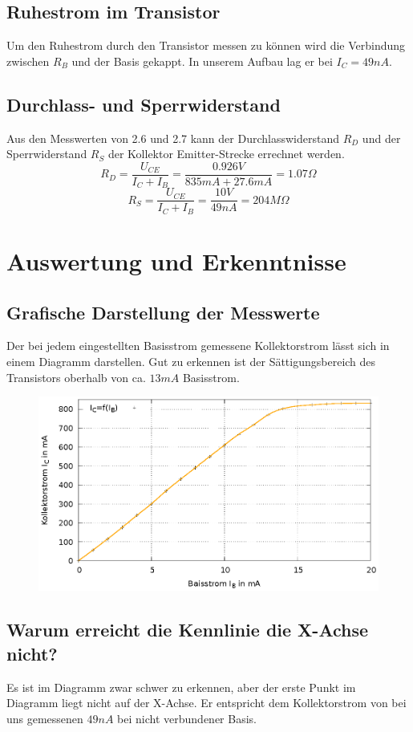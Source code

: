 \documentclass[
a4paper,     %
 headsepline, %
11pt         %
]{scrartcl}  %
\begin{document}
\subsection{Ruhestrom im Transistor}
Um den Ruhestrom durch den Transistor messen zu können wird die Verbindung zwischen $R_B$ und der Basis gekappt. In unserem Aufbau lag er bei $I_C=49nA$.

\subsection{Durchlass- und Sperrwiderstand}
Aus den Messwerten von 2.6 und 2.7 kann der Durchlasswiderstand $R_D$ und der Sperrwiderstand $R_S$ der Kollektor Emitter-Strecke errechnet werden.
\[R_D=\frac{U_{CE}}{I_C+I_B}=\frac{0.926V}{835mA+27.6mA}=1.07\Omega\]
\[R_S=\frac{U_{CE}}{I_C+I_B}=\frac{10V}{49nA}=204M\Omega\]

\section{Auswertung und Erkenntnisse}
\subsection{Grafische Darstellung der Messwerte}
Der bei jedem eingestellten Basisstrom gemessene Kollektorstrom lässt sich in einem Diagramm darstellen. Gut zu erkennen ist der Sättigungsbereich des Transistors oberhalb von ca. $13mA$ Basisstrom.
\begin{figure}[hbtp]
\centering
\includegraphics{kennlinie.eps}
\end{figure}

\subsection{Warum erreicht die Kennlinie die X-Achse nicht?}
Es ist im Diagramm zwar schwer zu erkennen, aber der erste Punkt im Diagramm liegt nicht auf der X-Achse. Er entspricht dem Kollektorstrom von bei uns gemessenen $49nA$ bei nicht verbundener Basis.
\end{document}
